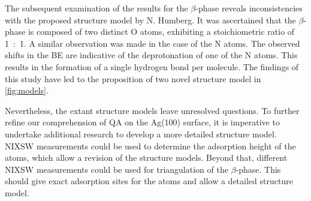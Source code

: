 The subsequent examination of the results for the $\beta$-phase reveals inconsistencies with the proposed structure model by N. Humberg\autocite{Humberg2024,Humberg2020}. It was ascertained that the $\beta$-phase is composed of two distinct O atoms, exhibiting a stoichiometric ratio of 1~:~1. A similar observation was made in the case of the N atoms. The observed shifts in the \ac{BE} are indicative of the deprotonation of one of the N atoms. This results in the formation of a single hydrogen bond per molecule. The findings of this study have led to the proposition of two novel structure model in \autoref{fig:models}.

Nevertheless, the extant structure models leave unresolved questions. To further refine our comprehension of \ac{QA} on the Ag(100) surface, it is imperative to undertake additional research to develop a more detailed structure model. \Ac{NIXSW} measurements could be used to determine the adsorption height of the atoms, which allow a revision of the structure models. Beyond that, different \ac{NIXSW} measurements could be used for triangulation of the $\beta$-phase. This should give exact adsorption sites for the atoms and allow a detailed structure model. 

\cleardoublepage